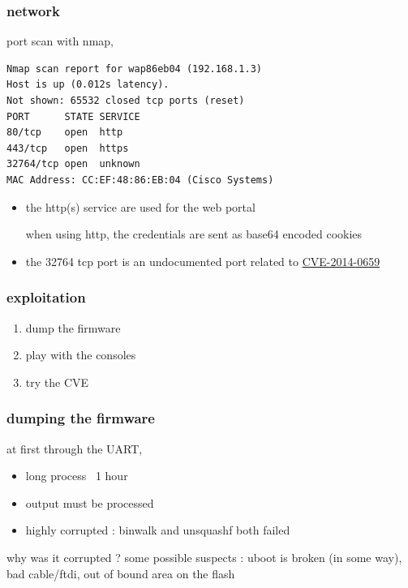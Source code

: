 \documentclass{beamer}
\begin{document}
\begin{frame}[fragile]
	\frametitle{network}
	port scan with nmap,
	\begin{verbatim}
Nmap scan report for wap86eb04 (192.168.1.3)  
Host is up (0.012s latency).  
Not shown: 65532 closed tcp ports (reset)  
PORT      STATE SERVICE  
80/tcp    open  http  
443/tcp   open  https  
32764/tcp open  unknown  
MAC Address: CC:EF:48:86:EB:04 (Cisco Systems)
	\end{verbatim}
	\begin{itemize}
		\item the http(s) service are used for the web portal
			\begin{itemize}
				when using http, the credentials are sent as base64 encoded cookies	
			\end{itemize}
		\item the 32764 tcp port is an undocumented port related to \href{https://nvd.nist.gov/vuln/detail/CVE-2014-0659}{CVE-2014-0659}
	\end{itemize}
\end{frame}

\begin{frame}
	\frametitle{exploitation}
	\begin{enumerate}
		\item dump the firmware
		\item play with the consoles
		\item try the CVE
	\end{enumerate}
\end{frame}
\begin{frame}
	\frametitle{dumping the firmware}	
	at first through the UART,
	\begin{itemize}
		\item long process ~1 hour
		\item output must be processed
		\item highly corrupted : binwalk and unsquashf both failed
	\end{itemize}
	\begin{block}{why was it corrupted ?}
		some possible suspects : uboot is broken (in some way), bad cable/ftdi, out of bound area on the flash
	\end{block}
\end{frame}
\end{document}
